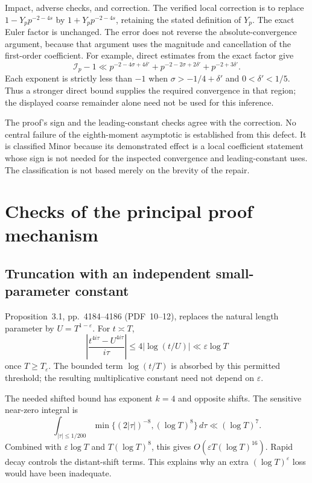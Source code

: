 \documentclass[10pt]{article}
\begin{document}
Impact, adverse checks, and correction. The verified local correction is to replace \(1-Y_pp^{-2-4s}\) by \(1+Y_pp^{-2-4s}\), retaining the stated definition of \(Y_p\). The exact Euler factor is unchanged. The error does not reverse the absolute-convergence argument, because that argument uses the magnitude and cancellation of the first-order coefficient. For example, direct estimates from the exact factor give \[\mathcal I_p-1\ll
p^{-2-4\sigma+4\delta'}
+p^{-2-2\sigma+2\delta'}
+p^{-2+3\delta'}.\] Each exponent is strictly less than \(-1\) when \(\sigma>-1/4+\delta'\) and \(0<\delta'<1/5\). Thus a stronger direct bound supplies the required convergence in that region; the displayed coarse remainder alone need not be used for this inference.\par
The proof’s sign and the leading-constant checks agree with the correction. No central failure of the eighth-moment asymptotic is established from this defect. It is classified Minor because its demonstrated effect is a local coefficient statement whose sign is not needed for the inspected convergence and leading-constant uses. The classification is not based merely on the brevity of the repair.\par
\section*{Checks of the principal proof mechanism}
\subsection*{Truncation with an independent small-parameter constant}
Proposition 3.1, pp. 4184–4186 (PDF 10–12), replaces the natural length parameter by \(U=T^{1-\varepsilon}\). For \(t\asymp T\), \[\left|\frac{t^{4i\tau}-U^{4i\tau}}{i\tau}\right|
\le4|\log(t/U)|\ll\varepsilon\log T\] once \(T\ge T_\varepsilon\). The bounded term \(\log(t/T)\) is absorbed by this permitted threshold; the resulting multiplicative constant need not depend on \(\varepsilon\).\par
The needed shifted bound has exponent \(k=4\) and opposite shifts. The sensitive near-zero integral is \[\int_{|\tau|\le1/200}
 \min\{(2|\tau|)^{-8},(\log T)^8\}\,d\tau
\ll(\log T)^7.\] Combined with \(\varepsilon\log T\) and \(T(\log T)^8\), this gives \(O(\varepsilon T(\log T)^{16})\). Rapid decay controls the distant-shift terms. This explains why an extra \((\log T)^\varepsilon\) loss would have been inadequate.\par
\end{document}
